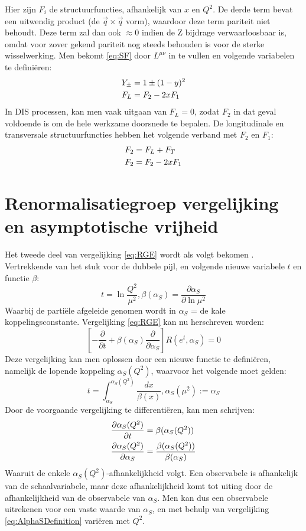 \documentclass[a4paper,11pt]{article}
\numberwithin{equation}{section} %
\begin{document}
Hier zijn $F_i$ de structuurfuncties, afhankelijk van $x$ en $Q^2$.
De derde term bevat een uitwendig product (de $\vec{q} \times \vec{q}$ vorm), waardoor deze term pariteit niet behoudt.
Deze term zal dan ook $\approx 0$ indien de Z bijdrage verwaarloosbaar is, omdat voor zover gekend pariteit nog steeds behouden is voor de sterke wisselwerking.
Men bekomt \eqref{eq:SF} door $L^{\mu \nu}$ in te vullen en volgende variabelen te definiëren:
\begin{align}
Y_\pm &= 1 \pm (1-y)^2 \notag \\
F_L &= F_2 - 2x F_1 \notag
\end{align}
In DIS processen, kan men vaak uitgaan van $F_L = 0$, zodat $F_2$ in dat geval voldoende is om de hele werkzame doorsnede te bepalen.
De longitudinale en transversale structuurfuncties hebben het volgende verband met $F_2$ en $F_1$:
\begin{align}
F_2 &= F_L + F_T \\
F_2 &= F_2 - 2xF_1 \notag
\end{align}

\section{Renormalisatiegroep vergelijking en asymptotische vrijheid} \label{app:RGE}
Het tweede deel van vergelijking \eqref{eq:RGE} wordt als volgt bekomen \cite{Ellis}.
Vertrekkende van het stuk voor de dubbele pijl, en volgende nieuwe variabele $t$ en functie $\beta$:
\begin{equation}
t = \ln{\frac{Q^2}{\mu^2}}, \beta(\alpha_S) =  \frac{\partial \alpha_S}{\partial \ln{\mu^2}}
\end{equation}
Waarbij de partiële afgeleide genomen wordt in $\alpha_S$ = de kale koppelingsconstante.
Vergelijking \eqref{eq:RGE} kan nu herschreven worden:
\begin{equation}
\left[ -\frac{\partial}{\partial t} + \beta(\alpha_S) \frac{\partial}{\partial \alpha_S} \right] R(e^t, \alpha_S) = 0
\end{equation}
Deze vergelijking kan men oplossen door een nieuwe functie te definiëren, namelijk de lopende koppeling $\alpha_S(Q^2)$, waarvoor het volgende moet gelden:
\begin{equation} \label{eq:AlphaSDefinition}
t = \int_{\alpha_S}^{\alpha_S(Q^2)} \frac{dx}{\beta(x)}, \alpha_S(\mu^2) := \alpha_S
\end{equation}
Door de voorgaande vergelijking te differentiëren, kan men schrijven:
\begin{align}
\frac{\partial \alpha_S(Q^2)}{\partial t} &= \beta( \alpha_S(Q^2) ) \notag \\ \frac{\partial \alpha_S(Q^2)}{\partial \alpha_S} &= \frac{\beta(\alpha_S(Q^2))}{\beta(\alpha_S)}
\end{align}
Waaruit de enkele $\alpha_S(Q^2)$-afhankelijkheid volgt.
Een observabele is afhankelijk van de schaalvariabele, maar deze afhankelijkheid komt tot uiting door de afhankelijkheid van de observabele van $\alpha_S$.
Men kan dus een observabele uitrekenen voor een vaste waarde van $\alpha_S$, en met behulp van vergelijking \eqref{eq:AlphaSDefinition} variëren met $Q^2$.
\end{document}
